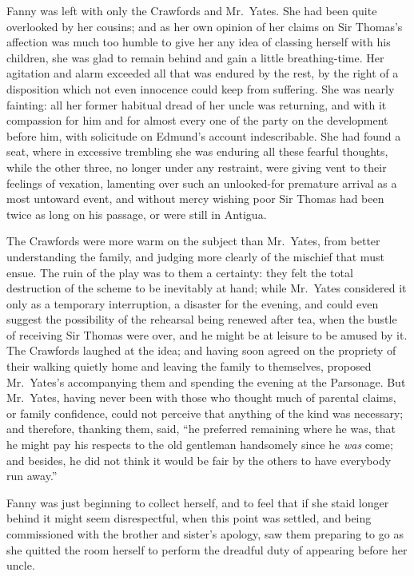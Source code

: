 \documentclass{article}
\begin{document}
Fanny was left with only the Crawfords and Mr.\ Yates.
She had been quite overlooked by her cousins; and as her
own opinion of her claims on Sir Thomas's affection
was much too humble to give her any idea of classing
herself with his children, she was glad to remain
behind and gain a little breathing-time. Her agitation
and alarm exceeded all that was endured by the rest,
by the right of a disposition which not even innocence
could keep from suffering.  She was nearly fainting:
all her former habitual dread of her uncle was returning,
and with it compassion for him and for almost every one
of the party on the development before him, with solicitude
on Edmund's account indescribable.  She had found a seat,
where in excessive trembling she was enduring all these
fearful thoughts, while the other three, no longer under
any restraint, were giving vent to their feelings of vexation,
lamenting over such an unlooked-for premature arrival
as a most untoward event, and without mercy wishing
poor Sir Thomas had been twice as long on his passage,
or were still in Antigua.

The Crawfords were more warm on the subject than Mr.\ Yates,
from better understanding the family, and judging more
clearly of the mischief that must ensue.  The ruin of
the play was to them a certainty:  they felt the total
destruction of the scheme to be inevitably at hand;
while Mr.\ Yates considered it only as a temporary interruption,
a disaster for the evening, and could even suggest the
possibility of the rehearsal being renewed after tea,
when the bustle of receiving Sir Thomas were over,
and he might be at leisure to be amused by it.
The Crawfords laughed at the idea; and having soon
agreed on the propriety of their walking quietly home
and leaving the family to themselves, proposed Mr.\ Yates's
accompanying them and spending the evening at the Parsonage.
But Mr.\ Yates, having never been with those who thought much
of parental claims, or family confidence, could not perceive
that anything of the kind was necessary; and therefore,
thanking them, said, ``he preferred remaining where he was,
that he might pay his respects to the old gentleman
handsomely since he \emph{was} come; and besides, he did not
think it would be fair by the others to have everybody run away.''

Fanny was just beginning to collect herself,
and to feel that if she staid longer behind it might
seem disrespectful, when this point was settled, and being
commissioned with the brother and sister's apology,
saw them preparing to go as she quitted the room herself
to perform the dreadful duty of appearing before her uncle.
\end{document}
